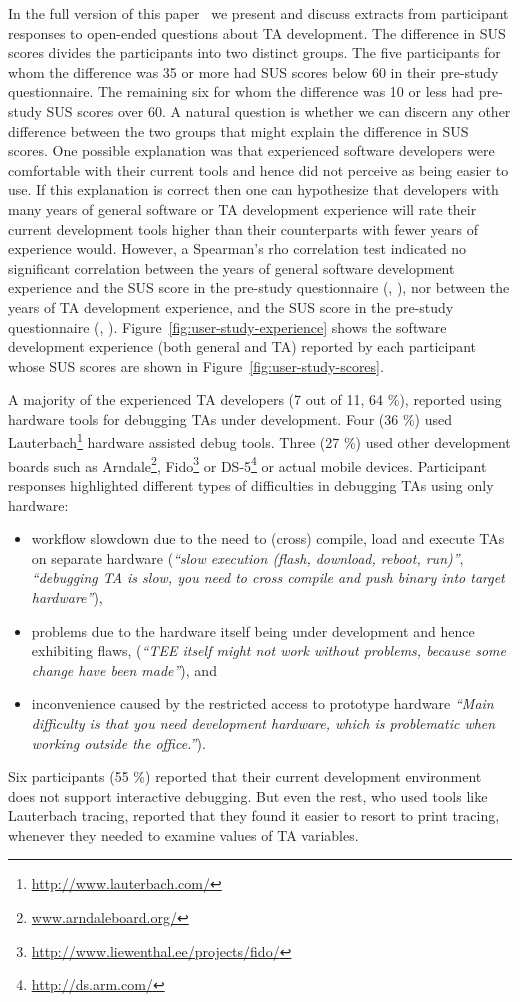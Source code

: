 \documentclass[10pt,conference,letterpaper]{IEEEtran}
\newif\ifabridged
\newcommand{\opentee}{\protect{TEE-Vi}\xspace}
\newcommand{\opentee}{\protect{Open-TEE}\xspace}
\begin{document}
\ifabridged
In the full version of this paper~\cite{MDNA15} we present and discuss
extracts from participant responses to open-ended questions about TA development.
\else
The difference in SUS scores divides the participants into two
distinct groups. The five participants for whom the difference was 35
or more had SUS scores below 60 in their pre-study questionnaire. The
remaining six for whom the difference was 10 or less had pre-study SUS
scores over 60. A natural question is whether we can discern any
other difference between the two groups that might explain the
difference in SUS scores. One possible explanation was that
experienced software developers were comfortable with their current
tools and hence did not perceive \opentee as being easier to use. If
this explanation is correct then one can hypothesize that developers
with many years of general software or TA development experience will
rate their current development tools higher than their counterparts
with fewer years of experience would. However, a Spearman's rho
correlation test indicated no significant correlation between the
years of general software development experience and the SUS score in
the pre-study questionnaire (, ), nor between the
years of TA development experience, and the SUS score in the pre-study
questionnaire (, ). 
Figure~\ref{fig:user-study-experience} shows the software
development experience (both general and TA) reported by each
participant whose SUS scores are shown in
Figure~\ref{fig:user-study-scores}. 


A majority of the experienced TA developers (7 out of 11, 64 \%),
reported using hardware tools for debugging TAs under
development. Four (36 \%) used
Lauterbach\footnote{\url{http://www.lauterbach.com/}} hardware
assisted debug tools. Three (27 \%) used other development boards such
as Arndale\footnote{\url{www.arndaleboard.org/}},
Fido\footnote{\url{http://www.liewenthal.ee/projects/fido/}} or
DS-5\footnote{\url{http://ds.arm.com/}} or actual mobile
devices. Participant responses highlighted different types of difficulties in
debugging TAs using only hardware:
\begin{itemize}
\itemsep0em
\item workflow slowdown due to the need to (cross) compile, load and
  execute TAs on separate hardware (\textit{``slow execution (flash,
    download, reboot, run)''}, \textit{``debugging TA is slow, you
    need to cross compile and push binary into target hardware''}),
\item problems due to the hardware itself being under development and
  hence exhibiting flaws, (\textit{``TEE itself might not work without
    problems, because some change have been made''}), and
\item inconvenience caused by the restricted access to prototype
  hardware \textit{``Main difficulty is that you need development
    hardware, which is problematic when working outside the
    office.''}).
\end{itemize}
Six participants (55 \%) reported that their current development
environment does not support interactive debugging. But even the rest,
who used tools like Lauterbach tracing, reported
that they found it easier to resort to print tracing,
whenever they needed to examine values of TA variables.
\end{document}
